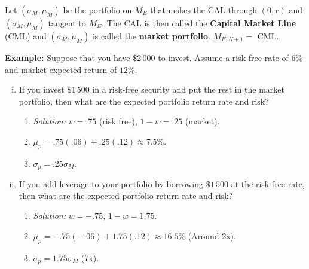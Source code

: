 Let \((\sigma_M, \mu_M)\) be the portfolio on \(M_E\) that makes the CAL through \((0, r)\) and \((\sigma_M, \mu_M)\) tangent to \(M_E\). The CAL is then called the \textbf{Capital Market Line} (CML) and \((\sigma_M, \mu_M)\) is called the \textbf{market portfolio}. \(M_{E, N+1} = \) CML.

\textbf{Example: } Suppose that you have \(\$2\,000\) to invest. Assume a risk-free rate of \(6\%\) and market expected return of \(12\%\).
\begin{enumerate}[i.]
    \item If you invest \(\$1\,500\) in a risk-free security and put the rest in the market portfolio, then what are the expected portfolio return rate and risk?
    \begin{enumerate}
        \item \textit{Solution: } \(w =.75\) (risk free), \(1-w = .25\) (market).

        \item \(\mu_p = .75(.06) + .25(.12) \approx 7.5\%\).

        \item \(\sigma_p = .25 \sigma_M\).
    \end{enumerate}

    \item If you add leverage to your portfolio by borrowing \(\$1\,500\) at the risk-free rate, then what are the expected portfolio return rate and risk?
    \begin{enumerate}
        \item \textit{Solution: } \(w = -.75\), \(1-w = 1.75\).

        \item \(\mu_p = -.75(-.06) + 1.75(.12) \approx 16.5\%\) (Around 2x).

        \item \(\sigma_p = 1.75\sigma_M\) (7x).
    \end{enumerate}
\end{enumerate}

